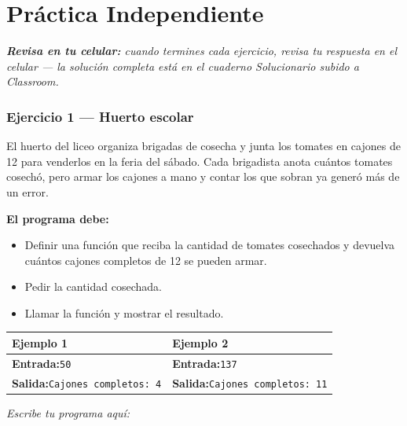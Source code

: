 \documentclass[11pt]{article}
\begin{document}
\section*{Práctica Independiente}

\textit{\textbf{Revisa en tu celular:} cuando termines cada ejercicio, revisa tu respuesta en el celular --- la solución completa está en el cuaderno Solucionario subido a Classroom.}

\vspace{2mm}

\subsubsection*{Ejercicio 1 --- Huerto escolar}
El huerto del liceo organiza brigadas de cosecha y junta los tomates en cajones de 12 para venderlos en la feria del sábado. Cada brigadista anota cuántos tomates cosechó, pero armar los cajones a mano y contar los que sobran ya generó más de un error.

\textbf{El programa debe:}
\begin{itemize}
  \item Definir una función que reciba la cantidad de tomates cosechados y devuelva cuántos cajones completos de 12 se pueden armar.
  \item Pedir la cantidad cosechada.
  \item Llamar la función y mostrar el resultado.
\end{itemize}
\vspace{1mm}
\noindent\begin{tabularx}{\linewidth}{|X|X|}
\hline
\textbf{Ejemplo 1} & \textbf{Ejemplo 2} \\
\hline
\textbf{Entrada:}\newline \texttt{50} & \textbf{Entrada:}\newline \texttt{137} \\
\hline
\textbf{Salida:}\newline \texttt{Cajones completos: 4} & \textbf{Salida:}\newline \texttt{Cajones completos: 11} \\
\hline
\end{tabularx}
\vspace{1mm}
\vspace{2mm}\textit{Escribe tu programa aquí:}\vspace{1mm}
\end{document}
